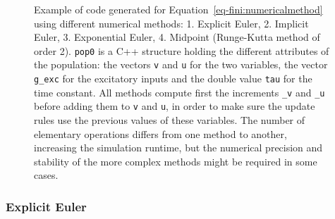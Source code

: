 \documentclass[
  11pt,
  a4paper,
]{scrbook}
\begin{document}
\begin{figure}


\caption{\label{fig-fini:numericalmethod}Example of code generated for
Equation~\ref{eq-fini:numericalmethod} using different numerical
methods: 1. Explicit Euler, 2. Implicit Euler, 3. Exponential Euler, 4.
Midpoint (Runge-Kutta method of order 2). \texttt{pop0} is a C++
structure holding the different attributes of the population: the
vectors \texttt{v} and \texttt{u} for the two variables, the vector
\texttt{g\_exc} for the excitatory inputs and the double value
\texttt{tau} for the time constant. All methods compute first the
increments \texttt{\_v} and \texttt{\_u} before adding them to
\texttt{v} and \texttt{u}, in order to make sure the update rules use
the previous values of these variables. The number of elementary
operations differs from one method to another, increasing the simulation
runtime, but the numerical precision and stability of the more complex
methods might be required in some cases.}

\end{figure}%

\subsubsection*{Explicit Euler}\label{explicit-euler}
\end{document}

